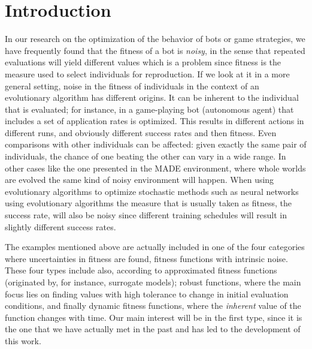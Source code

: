 \documentclass{llncs}
\begin{document}

\section{Introduction}
In our research on the optimization of the behavior of bots or game
strategies, we have frequently found that the fitness of a bot is {\em
  noisy}, in the sense that repeated evaluations will yield different
values \cite{DBLP:journals/jcst/MoraFGGF12} which is a problem since
fitness is the measure used to select individuals for reproduction. If
we look at it in a more general setting, 
noise in the fitness of individuals in the context of an evolutionary algorithm has different origins. It can be inherent to the
individual that is evaluated; for instance, in 
\cite{DBLP:journals/jcst/MoraFGGF12} a game-playing bot (autonomous agent) that includes a set of application rates is optimized. This results in different
actions in different runs, and obviously different success rates and
then fitness. Even comparisons with other individuals can be affected:
given exactly the same pair of individuals, the chance of one beating
the other can vary in a wide range. In other cases like the one
presented in the MADE environment, where whole worlds are evolved
\cite{2014arXiv1403.3084G} the same kind of noisy environment will
happen.  When using evolutionary algorithms to optimize stochastic
methods such as neural networks \cite{castilloGECCO99}
using evolutionary algorithms the measure that is usually taken as
fitness, the success rate, will also be noisy since different training
schedules will result in slightly different success rates. 

The examples mentioned above are actually included in one of the four categories
where uncertainties in fitness are found, fitness functions with intrinsic noise. These four types include also,
according to \cite{Jin2005303} approximated fitness functions
(originated by, for instance, surrogate models); robust functions,
where the main focus lies on finding values with high tolerance to
change in initial evaluation conditions, and finally dynamic fitness
functions, where the {\em inherent} value of the function changes with
time. 
Our main interest will be in the first type, since it is the one
that we have actually met in the past and has led to the development
of this work. 
\end{document}
